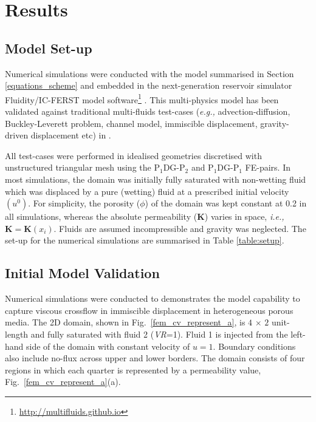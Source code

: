 \documentclass[preprint,authoryear,12pt]{elsarticle}
\newcommand{\PN}[2][error]{P$_{#1}$DG-P$_{#2}$}
\newcommand{\eg}{{\it e.g., }}
\newcommand{\ie}{{\it i.e., }}
\begin{document}
\section{Results}\label{section:results} 

\subsection{Model Set-up}\label{section:results:setup}
Numerical simulations were conducted with the model summarised in Section \ref{equations_scheme} and embedded in the next-generation reservoir simulator Fluidity/IC-FERST model software\footnote{\href{http://multifluids.github.io}{http://multifluids.github.io}} \citep[a full description of the model can be found in][]{porosity_documentation,fluidity_manual,jackson_2013,gomes_2017}. This multi-physics model has been validated against traditional multi-fluids test-cases (\eg advection-diffusion, Buckley-Leverett problem, channel model, immiscible displacement, gravity-driven displacement etc) in \citet{radunz_2014,jackson_2015,salinas2015,pavlidis2016}.
 
\medskip
All test-cases were performed in idealised geometries discretised with unstructured triangular mesh using the \PN[1]{2} and \PN[1]{1} FE-pairs. In most simulations, the domain was initially fully saturated with non-wetting fluid which was displaced by a pure (wetting) fluid at a prescribed initial velocity $\left(u^{0}\right)$. For simplicity, the porosity ($\phi$) of the domain was kept constant at 0.2 in all simulations, whereas the absolute permeability ($\mathbf{K}$) varies in space, \ie $\mathbf{K}=\mathbf{K}\left(x_{i}\right)$. Fluids are assumed incompressible and gravity was neglected. The set-up for the numerical simulations are summarised in Table \ref{table:setup}.
 
\subsection{Initial Model Validation}\label{section:results_validation}
Numerical simulations \citep[based on lab experiments due to][]{evans_1994,dawe_2008} were conducted to demonstrates the model capability to capture viscous crossflow in immiscible displacement in heterogeneous porous media. The 2D domain, shown in Fig.~\ref{fem_cv_represent_a}, is $4$ $\times$ $2$ unit-length and fully saturated with fluid 2 ({\it VR}=1). Fluid 1 is injected from the left-hand side of the domain with constant velocity of $u=1$. Boundary conditions also include no-flux across upper and lower borders. The domain consists of four regions in which each quarter is represented by a permeability value, Fig.~\ref{fem_cv_represent_a}(a).
\end{document}
